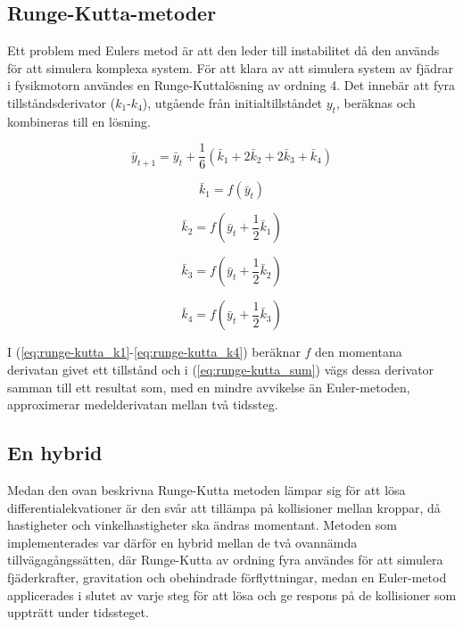\documentclass[a4paper,12pt,twopage,swedish]{article}
\begin{document}
\subsection{Runge-Kutta-metoder}
Ett problem med Eulers metod är att den leder till instabilitet då den används för att simulera komplexa system. För att klara av att simulera system av fjädrar i fysikmotorn användes en Runge-Kuttalösning av ordning 4. Det innebär att fyra tillståndsderivator ($k_1$-$k_4$), utgående från initialtillståndet $y_t$, beräknas och kombineras till en lösning.

\begin{equation}\label{eq:runge-kutta_sum}
\bar{y}_{t+1} = \bar{y}_t + \frac{1}{6}\left(\bar{k}_1 + 2\bar{k}_2 + 2\bar{k}_3 + \bar{k}_4\right)
\end{equation}

\begin{equation}\label{eq:runge-kutta_k1}
\bar{k}_1 = f(\bar{y}_t)
\end{equation}

\begin{equation}\label{eq:runge-kutta_k2}
\bar{k}_2 = f(\bar{y}_t + \frac{1}{2}\bar{k}_1)
\end{equation}

\begin{equation}\label{eq:runge-kutta_k3}
\bar{k}_3 = f(\bar{y}_t + \frac{1}{2}\bar{k}_2)
\end{equation}

\begin{equation}\label{eq:runge-kutta_k4}
\bar{k}_4 = f(\bar{y}_t + \frac{1}{2}\bar{k}_3)
\end{equation}

I (\ref{eq:runge-kutta_k1}-\ref{eq:runge-kutta_k4}) beräknar $f$ den momentana derivatan givet ett tillstånd och i (\ref{eq:runge-kutta_sum}) vägs dessa derivator samman till ett resultat som, med en mindre avvikelse än Euler-metoden, approximerar medelderivatan mellan två tidssteg.

\subsection{En hybrid}
Medan den ovan beskrivna Runge-Kutta metoden lämpar sig för att lösa differentialekvationer är den svår att tillämpa på kollisioner mellan kroppar, då hastigheter och vinkelhastigheter ska ändras momentant. Metoden som implementerades var därför en hybrid mellan de två ovannämda tillvägagångssätten, där Runge-Kutta av ordning fyra användes för att simulera fjäderkrafter, gravitation och obehindrade förflyttningar, medan en Euler-metod applicerades i slutet av varje steg för att lösa och ge respons på de kollisioner som uppträtt under tidssteget.
\end{document}
